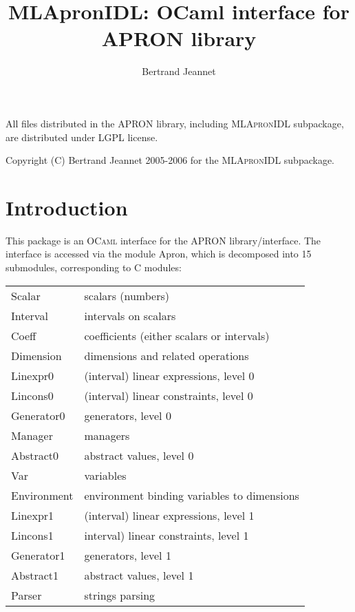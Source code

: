 \documentclass[twoside,10pt,a4paper]{report}
\title{MLApronIDL: OCaml interface for APRON library}
\author{Bertrand Jeannet}
\begin{document}
\maketitle

\vspace*{0.9\textheight}

All files distributed in the APRON library, including \textsc{MLApronIDL}
subpackage, are distributed under LGPL license.

Copyright (C) Bertrand Jeannet 2005-2006 for the
\textsc{MLApronIDL} subpackage.

\newpage

\tableofcontents

\chapter{Introduction}

This package is an \textsc{OCaml} interface for the APRON
library/interface.  The interface is accessed via the module
Apron, which is decomposed into 15 submodules, corresponding to C
modules:

\noindent
\begin{tabular}{l@{~:~~}l}
Scalar     & scalars (numbers) \\
Interval   & intervals on scalars \\
Coeff      & coefficients (either scalars or intervals) \\
Dimension  & dimensions and related operations \\
Linexpr0   & (interval) linear expressions, level 0 \\
Lincons0   & (interval) linear constraints, level 0 \\
Generator0 & generators, level 0 \\
Manager    & managers \\
Abstract0  & abstract values, level 0 \\
Var        & variables \\
Environment& environment binding variables to dimensions \\
Linexpr1   & (interval) linear expressions, level 1 \\
Lincons1   & interval) linear constraints, level 1 \\
Generator1 & generators, level 1 \\
Abstract1  & abstract values, level 1 \\
Parser     & strings parsing 
\end{tabular}
\end{document}
